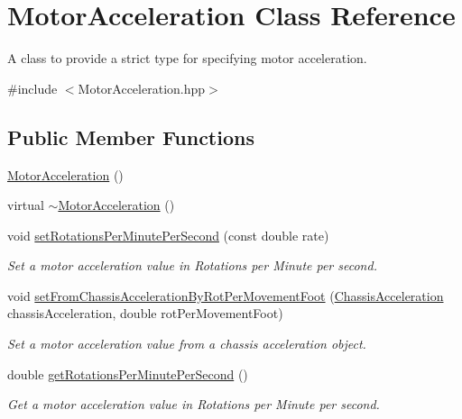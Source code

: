 \hypertarget{classMotorAcceleration}{\section{Motor\-Acceleration Class Reference}
\label{classMotorAcceleration}
}


A class to provide a strict type for specifying motor acceleration.  




{\ttfamily \#include $<$Motor\-Acceleration.\-hpp$>$}

\subsection*{Public Member Functions}
\begin{DoxyCompactItemize}
\item 
\hyperlink{classMotorAcceleration_a72f063dc64724f540d7decff01a23f6f}{Motor\-Acceleration} ()
\item 
virtual \hyperlink{classMotorAcceleration_a0726b77fa1f8d306f7396e19a8cd4f45}{$\sim$\-Motor\-Acceleration} ()
\item 
void \hyperlink{classMotorAcceleration_afab1d3a188fff9779b581dcdb82310cb}{set\-Rotations\-Per\-Minute\-Per\-Second} (const double rate)
\begin{DoxyCompactList}\small\item\em Set a motor acceleration value in Rotations per Minute per second. \end{DoxyCompactList}\item 
void \hyperlink{classMotorAcceleration_a2d02913363b7ccbec7dea4d42bfed268}{set\-From\-Chassis\-Acceleration\-By\-Rot\-Per\-Movement\-Foot} (\hyperlink{classChassisAcceleration}{Chassis\-Acceleration} chassis\-Acceleration, double rot\-Per\-Movement\-Foot)
\begin{DoxyCompactList}\small\item\em Set a motor acceleration value from a chassis acceleration object. \end{DoxyCompactList}\item 
double \hyperlink{classMotorAcceleration_a51cc0b4db4e977b2076d23e77608e4aa}{get\-Rotations\-Per\-Minute\-Per\-Second} ()
\begin{DoxyCompactList}\small\item\em Get a motor acceleration value in Rotations per Minute per second. \end{DoxyCompactList}\end{DoxyCompactItemize}
